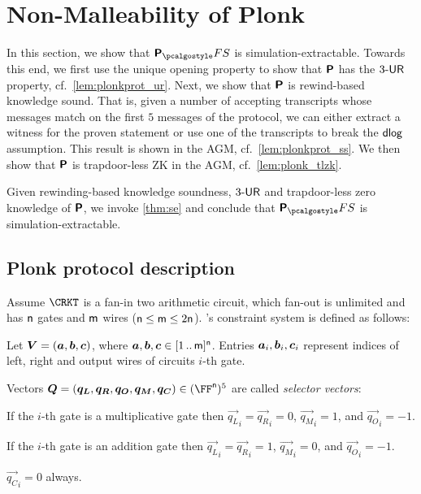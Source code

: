 
\section{Non-Malleability of Plonk} 
\label{sec:plonk}
In this section, we show that $\plonkprotfs$ is simulation-extractable. Towards this end, we first use the unique opening property to show that
$\bm{\mathsf{P}}$ has the ${3\text{-}\mathsf{UR}}$ property,
cf.~\cref{lem:plonkprot_ur}.
Next, we show that $\bm{\mathsf{P}}$ is rewind-based knowledge sound. That is, given a number of accepting transcripts whose messages match on the first $5$ messages of the protocol, we can either extract a witness for the proven statement or use one of the transcripts to break the $\mathsf{dlog}$ assumption. This result is shown in the AGM, cf.~\cref{lem:plonkprot_ss}. We then show that $\bm{\mathsf{P}}$ is trapdoor-less ZK in the AGM, cf.~\cref{lem:plonk_tlzk}.

Given rewinding-based knowledge soundness, ${3\text{-}\mathsf{UR}}$ and trapdoor-less zero knowledge of $\bm{\mathsf{P}}$, we invoke \cref{thm:se} and conclude that $\plonkprot_\fs$ is simulation-extractable.

\newcommand{\vql}{\vec{q_{L}}}
\newcommand{\vqr}{\vec{q_{R}}}
\newcommand{\vqm}{\vec{q_{M}}}
\newcommand{\vqo}{\vec{q_{O}}}
\newcommand{\vx}{\vec{x}}
\newcommand{\vqc}{\vec{q_{C}}}

\subsection{Plonk protocol description}
\label{sec:plonk_explained}
Assume $\CRKT$ is a fan-in two arithmetic circuit,
which fan-out is unlimited and has $\mathsf{n}$ gates and $\mathsf{m}$ wires
($\mathsf{n} \leq \mathsf{m} \leq 2\mathsf{n}$). \plonk's constraint
system is defined as follows:
\begin{compactitem}
\item Let $\vec{V} = (\va, \vb, \vc)$, where $\va, \vb, \vc
  \in \range{1}{\noofw}^\numberofconstrains$. Entries $\va_i, \vb_i, \vc_i$ represent indices of left,
  right and output wires of circuits $i$-th gate.
\item Vectors $\vec{Q} = (\vql, \vqr, \vqo, \vqm, \vqc) \in
  (\FF^\numberofconstrains)^5$ are called \emph{selector vectors}:
  \begin{inparaenum}[(a)]
  \item If the $i$-th gate is a multiplicative gate then $\vql_i = \vqr_i = 0$,
    $\vqm_i = 1$, and $\vqo_i = -1$. 
  \item If the $i$-th gate is an addition gate then $\vql_i = \vqr_i  = 1$, $\vqm_i =
    0$, and $\vqo_i = -1$. 
  \item $\vqc_i = 0$ always. 
  \end{inparaenum}
\end{compactitem}

